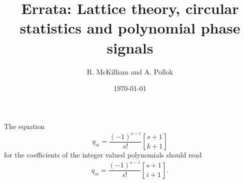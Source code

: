 \documentclass{article}
\title{Errata: Lattice theory, circular statistics and polynomial phase signals}
\author{R. McKilliam and A. Pollok}
\date{\today}
\begin{document}
\maketitle

\newcommand{\stirling}[2]{\genfrac{[}{]}{0pt}{}{#1}{#2}}

The equation
\[
q_{si} = \frac{(-1)^{s-i}}{s!}\stirling{s+1}{k+1}
\]
for the coefficients of the integer valued polynomials should read
\[
q_{si} = \frac{(-1)^{s-i}}{s!}\stirling{s+1}{i+1}.
\] 
\end{document}
